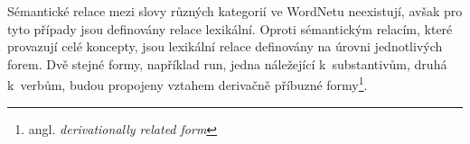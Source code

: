 \documentclass[a4paper, 11pt, oneside, showtrims]{book}
\newcommand{\itNameRef}[1]{\textit{\nameref{#1}}}
\newcommand\ex{\textsf}
\begin{document}
					Sémantické relace mezi slovy různých kategorií ve WordNetu neexistují, avšak pro tyto případy jsou definovány relace lexikální. Oproti sémantickým relacím, které provazují celé koncepty, jsou lexikální relace definovány na úrovni jednotlivých forem. Dvě stejné formy, například \ex{run}, jedna náležející k~substantivům, druhá k~verbům, budou propojeny vztahem derivačně příbuzné formy\footnote{angl. \textit{derivationally related form}}. \parencite{wndocsWNgloss}



\end{document}
